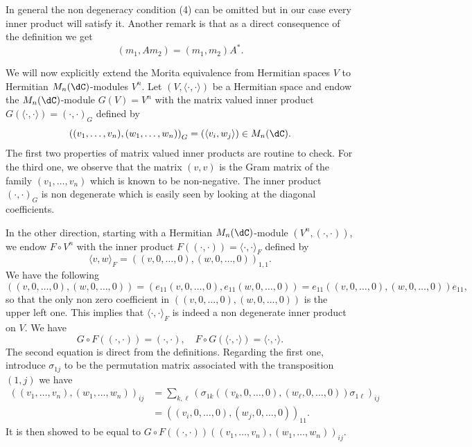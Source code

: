 \documentclass[a4paper,reqno]{amsart}
\theoremstyle{definition}
\numberwithin{equation}{section}
\begin{document}
In general the non degeneracy condition (4) can be omitted but in our case every inner product will satisfy it.  Another remark is that as a direct consequence of the definition we get
\begin{equation}
(m_1,A m_2)=(m_1,m_2)A^*.    
\end{equation}
 

We will now explicitly extend the Morita equivalence from Hermitian spaces $V$ to Hermitian $M_n(\dC)$-modules $V^n$. Let $(V,\langle \cdot,\cdot \rangle)$ be a Hermitian space and endow the $M_n(\dC)$-module $G(V)=V^n$ with the matrix valued inner product $G(\langle\cdot,\cdot\rangle)=(\cdot,\cdot)_G$ defined by 
\begin{equation}
\label{eq:mv-innerproduct}
    \left( ( v_1,\ldots, v_n),(w_1,\ldots, w_n)\right)_G = (\langle v_i,w_j\rangle) \in M_n(\dC). 
\end{equation}
The first two properties of matrix valued inner products are routine to check. For the third one, we observe that the matrix $(v,v)$ is the Gram matrix of the family $(v_1,\ldots,v_n)$ which is known to be non-negative. The inner product $(\cdot,\cdot)_G$ is non degenerate which is easily seen by looking at the diagonal coefficients.  

In the other direction, starting with a Hermitian $M_n(\dC)$-module $(V^n,(\cdot,\cdot))$, we endow $F\circ V^n$ with the inner product $F((\cdot,\cdot))=\langle \cdot, \cdot\rangle_F$ defined by 
\begin{equation}
    \langle v,w\rangle_F =( (v,0,\ldots,0),(w,0,\ldots,0))_{1,1}.
\end{equation}
We have the following
\begin{equation}
((v,0,\ldots,0),(w,0,\ldots,0))=(e_{11}(v,0,\ldots,0),e_{11}(w,0,\ldots,0))=e_{11}((v,0,\ldots,0),(w,0,\ldots,0))e_{11},
\end{equation}
so that the only non zero coefficient in $((v,0,\ldots,0),(w,0,\ldots,0))$ is the upper left one. This implies that $\langle\cdot,\cdot\rangle_F$ is indeed a non degenerate inner product on $V$. 
We have 
\[
G\circ F( (\cdot,\cdot))=(\cdot,\cdot),\quad F\circ G (\langle \cdot, \cdot\rangle)=\langle \cdot, \cdot\rangle. 
\]
The second equation is direct from the definitions. Regarding the first one, introduce $\sigma_{1j}$ to be the permutation matrix associated with the transposition $(1,j)$ we have
\begin{align}
    ((v_1,\ldots,v_n),(w_1,\ldots,w_n))_{ij}&=\sum_{k,\ell} \left(\sigma_{1k} ((v_k,0,\ldots,0),(w_\ell,0,\ldots,0))\sigma_{1\ell}\right)_{ij}\nonumber\\
    &=((v_i,0,\ldots,0),(w_j,0,\ldots,0))_{11}.
\end{align}
It is then showed to be equal to $G\circ F( (\cdot,\cdot))((v_1,\ldots,v_n),(w_1,\ldots,w_n))_{ij}$. 
\end{document}
